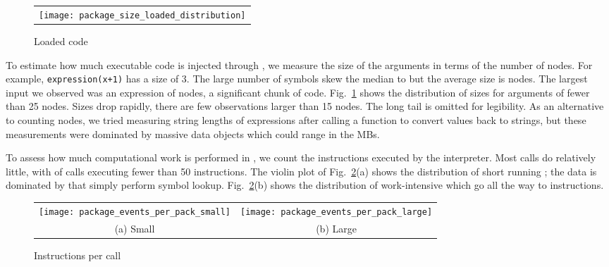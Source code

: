 \documentclass[acmsmall, screen]{acmart}
\renewcommand{\k}[1]{\lstinline |#1|\xspace}
\begin{document}
\begin{figure}[!h]
\begin{tabular}{c}
{\texttt{[image: package\_size\_loaded\_distribution]}}
\end{tabular}
\caption{Loaded code} \label{fig:sizedistribution}
\end{figure}

To estimate how much executable code is injected through \eval, we measure the
size of the arguments in terms of the number of nodes. For example,
\k{expression(x+1)} has a size of 3. The large number of symbols skew the median
to \packageMedianszeval but the average size is \packageAvgszeval nodes. The
largest \eval input we observed was an expression of \packageMaxszeval nodes, a
significant chunk of code. Fig.~\ref{fig:sizedistribution} shows the
distribution of sizes for arguments of fewer than 25 nodes. Sizes drop rapidly,
there are few observations larger than 15 nodes. The long tail is omitted for
legibility. As an alternative to counting nodes, we tried measuring string
lengths of expressions after calling a function to convert values back to
strings, but these measurements were dominated by massive data objects which
could range in the MBs.

To assess how much computational work is performed in \evals, we count the
instructions executed by the interpreter. Most calls do relatively little, with
\packageSmalleventspct of calls executing fewer than 50 instructions. The violin
plot of Fig.~\ref{ev}(a) shows the distribution of short running \evals; the
data is dominated by \evals that simply perform symbol lookup. Fig.~\ref{ev}(b)
shows the distribution of work-intensive \evals which go all the way to
\packageMaxeventsRnd instructions.

\begin{figure}[h!]
\begin{tabular}{@{}c@{}c@{}}
\begin{minipage}{7.5cm}
 \texttt{[image: package\_events\_per\_pack\_small]}
\end{minipage}&\begin{minipage}{7.5cm}
  \texttt{[image: package\_events\_per\_pack\_large]}
\end{minipage}\\[-3mm]
\small (a) Small & \small (b) Large
\end{tabular}
 \caption{Instructions per call} \label{ev}
\end{figure}
\end{document}
